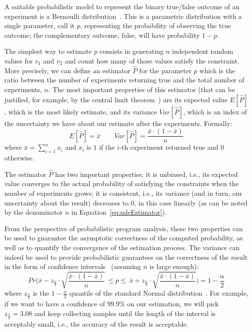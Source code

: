 A suitable probabilistic model to represent the binary true/false outcome of an experiment is a Bernoulli distribution~\cite{pestman1998mathematical}. This is a parametric distribution with a single parameter, call it $p$, representing the probability of observing the true outcome; the complementary outcome, false, will have probability $1-p$.

The simplest way to estimate $p$ consists in generating $n$ independent random values for $v_1$ and $v_2$ and count how many of those values satisfy the constraint. More precisely, we can define an estimator $\hat{P}$ for the parameter $p$ which is the ratio between the number of experiments returning true and the total number of experiments, $n$. The most important properties of this estimator (that can be justified, for example, by the central limit theorem~\cite{pestman1998mathematical}) are its expected value $E[\hat{P}]$, which is the most likely estimate, and its variance $Var[\hat{P}]$, which is an index of the uncertainty we have about our estimate after the experiments. Formally:
%
\begin{equation}\label{eq:mleEstimator}
	E[\hat{P}] = \bar{x} \qquad Var[\hat{P}] = \frac{\bar{x} \cdot (1-\bar{x})}{n}
\end{equation}
%
\noindent where $\bar{x}=\sum_{i=1}^n x_i$ and $x_i$ is $1$ if the $i$-th experiment returned true and $0$ otherwise.

The estimator $\hat{P}$ has two important properties: it is unbiased, i.e., its expected value converges to the actual probability of satisfying the constraints when the number of experiments grows; it is consistent, i.e., its variance (and in turn, our uncertainty about the result) decreases to 0, in this case linearly (as can be noted by the denominator $n$ in Equation~\eqref{eq:mleEstimator}). 

From the perspective of probabilistic program analysis, these two properties can be used to guarantee the asymptotic correctness of the computed probability, as well as to quantify the convergence of the estimation process. The variance can indeed be used to provide probabilistic guarantees on the correctness of the result in the form of confidence intervals~\cite{pestman1998mathematical} (assuming $n$ is large enough):
%
\begin{equation}\label{eqConfidenceInterval}
	Pr\Big( \bar{x} - z_{\frac{\alpha}{2}} \cdot \sqrt{\frac{\bar{x} \cdot (1-\bar{x})}{n}} \ \leq p \leq \ \bar{x} + z_{\frac{\alpha}{2}} \cdot \sqrt{\frac{\bar{x} \cdot (1-\bar{x})}{n}} \Big) = 1-\frac{\alpha}{2}
\end{equation}
%
\noindent where $z_{\frac{\alpha}{2}}$ is the $1-\frac{\alpha}{2}$ quantile of the standard Normal distribution~\cite{pestman1998mathematical}. For example, if we want to have a confidence of $99.9\%$ on our estimation, we will pick $z_{\frac{\alpha}{2}}=3.08$ and keep collecting samples until the length of the interval is acceptably small, i.e., the accuracy of the result is acceptable.

